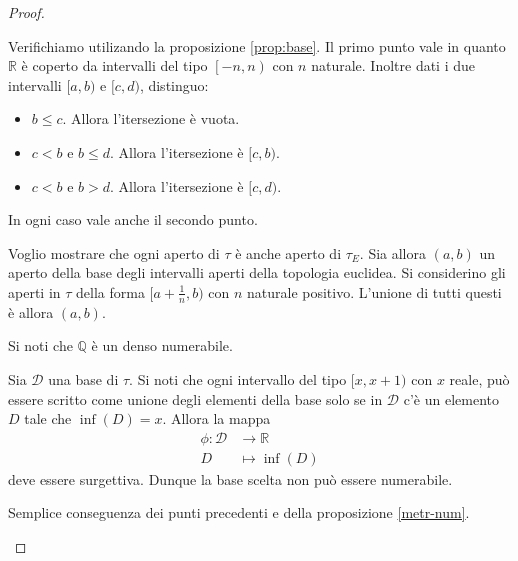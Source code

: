 \documentclass{article}
\begin{document}
\begin{proof}
    \begin{nlist}
        \item Verifichiamo utilizando la proposizione \ref{prop:base}. Il primo
        punto vale in quanto $\mathbb{R}$ \`e coperto da intervalli del tipo
        $\left[-n, n\right)$ con $n$ naturale. Inoltre dati i due intervalli
        $[a,b)$ e $[c,d)$, distinguo:
        \begin{itemize}
            \item $b\leq c$. Allora l'itersezione \`e vuota.
            \item $c < b$ e $b \leq d$. Allora l'itersezione \`e $[c,b)$.
            \item $c < b$ e $b > d$. Allora l'itersezione \`e $[c,d)$.
        \end{itemize}
        In ogni caso vale anche il secondo punto.

        \item Voglio mostrare che ogni aperto di $\tau$ \`e anche aperto di
        $\tau_E$. Sia allora $(a, b)$ un aperto della base degli intervalli
        aperti della topologia euclidea. Si considerino gli aperti in $\tau$
        della forma $[a+\frac{1}{n},b)$ con $n$ naturale positivo. L'unione di
        tutti questi \`e allora $(a,b)$.

        \item Si noti che $\mathbb{Q}$ \`e un denso numerabile.

        \item Sia $\mathcal{D}$ una base di $\tau$. Si noti che ogni intervallo
        del tipo $[x,x+1)$ con $x$ reale, pu\`o essere scritto come unione degli
        elementi della base solo se in $\mathcal{D}$ c'\`e un elemento $D$ tale
        che $\inf(D) = x$. Allora la mappa
        \begin{align*}
            \phi:\mathcal{D}&\to \mathbb{R}\\
            D & \mapsto \inf(D)
        \end{align*}
        deve essere surgettiva. Dunque la base scelta non pu\`o essere
        numerabile.

        \item Semplice conseguenza dei punti precedenti e della proposizione
        \ref{metr-num}.
    \end{nlist}
\end{proof}
\end{document}
